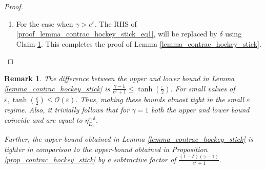 \documentclass[onecolumn,ldraftcls, 11pt]{IEEEtran}
\newcommand{\eps}{\varepsilon}
\newtheorem{remark}{Remark}
\newtheorem{claim}{Claim}
\begin{document}
\begin{proof}
\begin{enumerate}[label=(\roman*)]
\begin{claim}\label{claim_hockey_stick_bound}
    For any $\gamma \geq 1, \eps\geq 0$ and $\delta \in [0,1)$, the quantum hockey stick divergence $E_{\gamma} (\rho_{(\eps,\delta)}\|\sigma_{(\eps,\delta)})$ satisfies the following,
    \begin{equation}
        E_{\gamma}(\rho_{(\eps,\delta)}\|\sigma_{(\eps,\delta)}) = \begin{cases}
            \frac{e^\eps -\gamma + \delta(\gamma+1)}{e^\eps+1}, & ~\mbox{if}~ \gamma \in [1,e^\eps],\\
            \delta, & ~\mbox{if}~ \gamma > e^\eps.
        \end{cases} \label{claim_hockey_stick_bound_eq}
    \end{equation}
    where $(\rho_{(\eps,\delta)},\sigma_{(\eps,\delta)})$ is the weakest (most informative) $(\eps,\delta)$-DP pair of quantum states as mentioned in \cref{eq_rho_simp,eq_rho'_simp}.
\end{claim}
\begin{proof}
    See Appendix \ref{proof_claim_hockey_stick_bound} for the proof.
\end{proof}

\vspace{5pt}
 
\item For the case when  $\gamma > e^\eps$. The RHS of \eqref{proof_lemma_contrac_hockey_stick_eq1}, will be replaced by $\delta$ using Claim \ref{claim_hockey_stick_bound}. This completes the proof of Lemma \ref{lemma_contrac_hockey_stick}.
\end{enumerate}

\end{proof}
\begin{remark}
  The difference between the upper and lower bound in Lemma \ref{lemma_contrac_hockey_stick} is $\frac{\gamma-1}{e^\eps+1} \leq \tanh(\frac{\eps}{2}).$ For small values of $\eps, \tanh(\frac{\eps}{2}) \leq \mathcal{O}(\eps).$ Thus, making these bounds almost tight in the small $\eps$ regime. Also, it trivially follows that for $\gamma=1$ both the upper and lower bound coincide and are equal to $\eta^{\eps,\delta}_{E_1}$. 

Further, the upper-bound obtained in Lemma \ref{lemma_contrac_hockey_stick} is tighter in comparison to the upper-bound obtained in Proposition \ref{prop_contrac_hockey_stick} by a subtractive factor of $\frac{(1-\delta)(\gamma-1)}{e^\eps+1}.$  
\end{remark}
\end{document}
